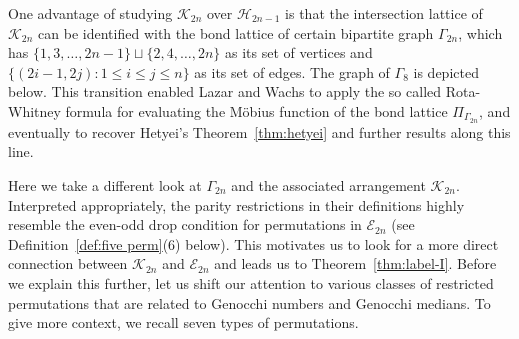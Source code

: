 \documentclass[11pt,reqno]{amsart}
\numberwithin{equation}{section}
\theoremstyle{plain}
\theoremstyle{definition}
\newcommand{\cE}{\mathcal{E}}
\newcommand{\cH}{\mathcal{H}}
\newcommand{\cK}{\mathcal{K}}
\begin{document}
One advantage of studying $\cK_{2n}$ over $\cH_{2n-1}$ is that the intersection lattice of $\cK_{2n}$ can be identified with the bond lattice of certain bipartite graph $\Gamma_{2n}$, which has $\{1,3,\ldots,2n-1\}\sqcup\{2,4,\ldots,2n\}$ as its set of vertices and $\{(2i-1,2j):1\le i\le j\le n\}$ as its set of edges. The graph of $\Gamma_8$ is depicted below. This transition enabled Lazar and Wachs to apply the so called Rota-Whitney formula for evaluating the M\"obius function of the bond lattice $\Pi_{\Gamma_{2n}}$, and eventually to recover Hetyei's Theorem~\ref{thm:hetyei} and further results along this line.

\begin{figure}
\centering
    
\end{figure}

Here we take a different look at $\Gamma_{2n}$ and the associated arrangement $\cK_{2n}$. Interpreted appropriately, the parity restrictions in their definitions highly resemble the even-odd drop condition for permutations in $\cE_{2n}$ (see Definition~\ref{def:five perm}(6) below). This motivates us to look for a more direct connection between $\cK_{2n}$ and $\cE_{2n}$ and leads us to Theorem~\ref{thm:label-I}. Before we explain this further, let us shift our attention to various classes of restricted permutations that are related to Genocchi numbers and Genocchi medians. To give more context, we recall seven types of permutations. 
\end{document}
